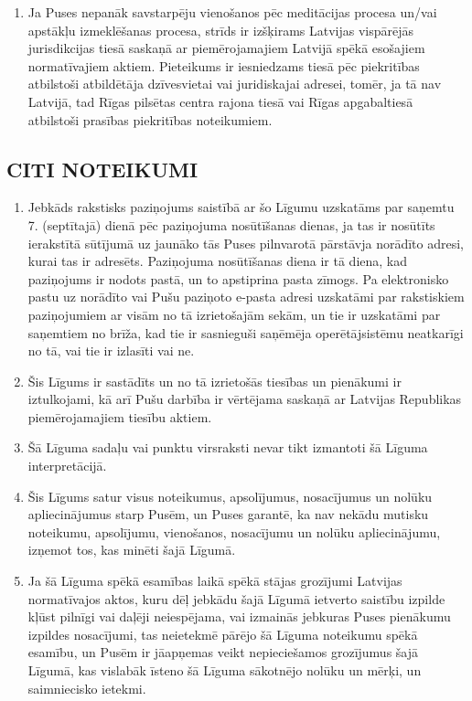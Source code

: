 \documentclass[a4paper]{article}
\begin{document}
\begin{multicols}{2}
\begin{enumerate}
  \item{Ja Puses nepanāk savstarpēju vienošanos pēc meditācijas procesa un/vai apstākļu izmeklēšanas procesa,
strīds ir izšķirams Latvijas vispārējās jurisdikcijas tiesā saskaņā ar piemērojamajiem Latvijā
spēkā esošajiem normatīvajiem aktiem. Pieteikums ir iesniedzams
tiesā pēc piekritības atbilstoši atbildētāja dzīvesvietai vai juridiskajai
adresei, tomēr, ja tā nav Latvijā, tad Rīgas pilsētas centra rajona tiesā
vai Rīgas apgabaltiesā atbilstoši prasības piekritības noteikumiem.}
  \end{enumerate}

  \subsection{CITI NOTEIKUMI}

  \begin{enumerate}
  \item{Jebkāds rakstisks paziņojums saistībā ar šo Līgumu uzskatāms par
saņemtu 7. (septītajā) dienā pēc paziņojuma nosūtīšanas dienas, ja
tas ir nosūtīts ierakstītā sūtījumā uz jaunāko tās Puses pilnvarotā
pārstāvja norādīto adresi, kurai tas ir adresēts. Paziņojuma
nosūtīšanas diena ir tā diena, kad paziņojums ir nodots pastā, un to
apstiprina pasta zīmogs. Pa elektronisko pastu uz norādīto vai Pušu
paziņoto e-pasta adresi uzskatāmi par rakstiskiem paziņojumiem ar
visām no tā izrietošajām sekām, un tie ir uzskatāmi par saņemtiem
no brīža, kad tie ir sasnieguši saņēmēja operētājsistēmu neatkarīgi
no tā, vai tie ir izlasīti vai ne.}

  \item{Šis Līgums ir sastādīts un no tā izrietošās tiesības un pienākumi ir
iztulkojami, kā arī Pušu darbība ir vērtējama saskaņā ar Latvijas
Republikas piemērojamajiem tiesību aktiem.}

  \item{Šā Līguma sadaļu vai punktu virsraksti nevar tikt izmantoti šā Līguma
interpretācijā.}

  \item{Šis Līgums satur visus noteikumus, apsolījumus, nosacījumus un
nolūku apliecinājumus starp Pusēm, un Puses garantē, ka nav nekādu
mutisku noteikumu, apsolījumu, vienošanos, nosacījumu un nolūku
apliecinājumu, izņemot tos, kas minēti šajā Līgumā. }

  \item{Ja šā Līguma spēkā esamības laikā spēkā stājas grozījumi Latvijas
normatīvajos aktos, kuru dēļ jebkādu šajā Līgumā ietverto saistību
izpilde kļūst pilnīgi vai daļēji neiespējama, vai izmainās jebkuras
Puses pienākumu izpildes nosacījumi, tas neietekmē pārējo šā
Līguma noteikumu spēkā esamību, un Pusēm ir jāapņemas veikt
nepieciešamos grozījumus šajā Līgumā, kas vislabāk īsteno šā Līguma
sākotnējo nolūku un mērķi, un saimniecisko ietekmi.}


\end{enumerate}
\end{multicols}
\end{document}
